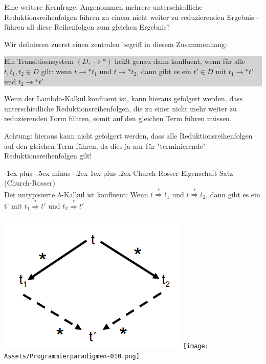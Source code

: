 \documentclass[10pt]{article}
\makeatletter
\renewcommand{\subsubsection}{\@startsection{subsubsection}{3}{0mm}%
                                {-1ex plus -.5ex minus -.2ex}%
                                {1ex plus .2ex}%
                                {\normalfont\small\bfseries}}
\makeatother
\begin{document}
\begin{itemize*}
\begin{itemize*}
    \end{itemize*}
    \item Eine weitere Kernfrage: Angenommen mehrere unterschiedliche Reduktionsreihenfolgen führen zu einem nicht weiter zu reduzierenden Ergebnis - \color{blue} führen all diese Reihenfolgen zum gleichen Ergebnis? \color{black}
    \item Wir definieren zuerst einen zentralen begriff in diesem Zusammenhang:
    \colorbox{lightgray}{\begin{minipage}[h]{1.0\linewidth}
        Ein Transitiosnsystem $(D,\rightarrow*)$ heißt genau dann konfluent, wenn für alle $t,t_1,t_2 \in D$ gilt: wenn  $ t \rightarrow* t_1$ und $t \rightarrow* t_2$, dann gibt es ein $t' \in D$ mit $t_1 \rightarrow* t'$ und $t_2 \rightarrow* t'$
      \end{minipage}}
    \item Wenn der Lambda-Kalkül konfluent ist, kann hieraus gefolgert werden, dass unterschiedliche Reduktionsreihenfolgen, die zu einer nicht mehr weiter zu reduzierenden Form führen, somit auf den gleichen Term führen müssen.
    \item Achtung: hieraus kann nicht gefolgert werden, dass alle Reduktionsreihenfolgen auf den gleichen Term führen, da dies ja nur für "terminierende" Reduktionsreihenfolgen gilt!
  \end{itemize*}
  
  \subsubsection{Church-Rosser-Eigenschaft}
  \color{blue} Satz (Church-Rosser) \\
  Der untypisierte $\lambda$-Kalkül ist konfluent: Wenn $t \stackrel{*}{\Rightarrow} t_1$ und $t \stackrel{*}{\Rightarrow} t_2$, dann gibt es ein t' mit $t_1 \stackrel{*}{\Rightarrow} t'$ und $t_2 \stackrel{*}{\Rightarrow} t'$
  \color{black}
  
  \begin{center}
    \includegraphics[width=0.25\linewidth]{Assets/Programmierparadigmen-diamant-eigenschaft.png}
    \texttt{[image: Assets/Programmierparadigmen-010.png]}
  \end{center}
  
\end{document}
